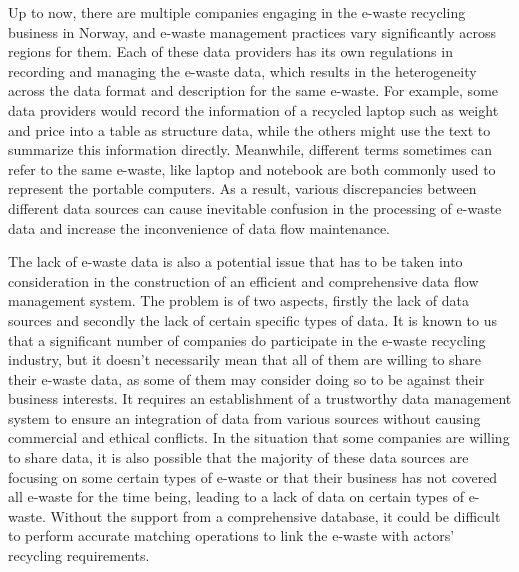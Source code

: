 \documentclass{article}
\numberwithin{equation}{section}
\begin{document}
Up to now, there are multiple companies engaging in the e-waste recycling business\cite{matt23} in Norway, and e-waste management practices vary significantly across regions for them. Each of these data providers has its own regulations in recording and managing the e-waste data, which results in the heterogeneity across the data format and description for the same e-waste. For example, some data providers would record the information of a recycled laptop such as weight and price into a table as structure data, while the others might use the text to summarize this information directly. Meanwhile, different terms sometimes can refer to the same e-waste, like laptop and notebook are both commonly used to represent the portable computers. As a result, various discrepancies between different data sources can cause inevitable confusion in the processing of e-waste data and increase the inconvenience of data flow maintenance.

The lack of e-waste data is also a potential issue that has to be taken into consideration in the construction of an efficient and comprehensive data flow management system. The problem is of two aspects, firstly the lack of data sources and secondly the lack of certain specific types of data. It is known to us that a significant number of companies do participate in the e-waste recycling industry, but it doesn't necessarily mean that all of them are willing to share their e-waste data, as some of them may consider doing so to be against their business interests. It requires an establishment of a trustworthy data management system to ensure an integration of data from various sources without causing commercial and ethical conflicts. In the situation that some companies are willing to share data, it is also possible that the majority of these data sources are focusing on some certain types of e-waste or that their business has not covered all e-waste for the time being, leading to a lack of data on certain types of e-waste. Without the support from a comprehensive database, it could be difficult to perform accurate matching operations to link the e-waste with actors’ recycling requirements.
\end{document}
